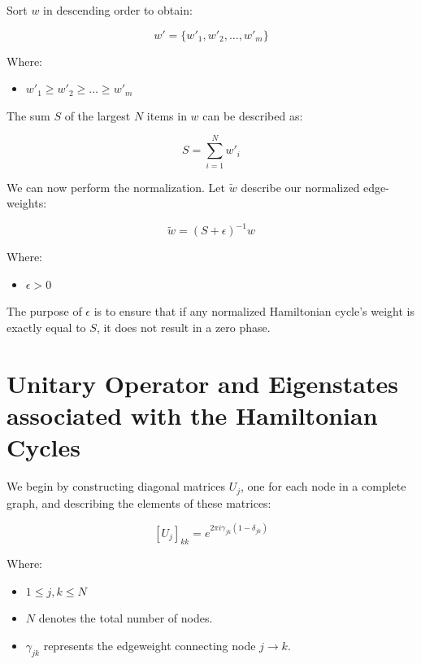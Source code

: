 \documentclass[msc,oneside]{ubcthesis}
\begin{document}
	Sort $w$ in descending order to obtain:
	
	\begin{equation}\label{sorted-weights}
	w' = \{w'_1, w'_2, \ldots, w'_m\}
	\end{equation}
	
	Where: \begin{itemize}
		\item[] $w'_1 \geq w'_2 \geq \ldots \geq w'_m$
		\end{itemize}
		
The sum $S$ of the largest $N$ items in $w$ can be described as:

\begin{equation}\label{sum-S}
S = \sum_{i=1}^{N} w'_i
\end{equation}

  We can now perform the normalization. Let $\tilde{w}$ describe our normalized edge-weights:
  
 \begin{equation}\label{normalization}
  	\tilde{w} = (S + \epsilon)^{-1}w
\end{equation}

Where: \begin{itemize}
	\item[] $\epsilon > 0$
\end{itemize}
The purpose of $\epsilon$ is to ensure that if any normalized Hamiltonian cycle's weight is exactly equal to $S$, it does not result in a zero phase.
	
	
	\section{Unitary Operator and Eigenstates associated with the Hamiltonian Cycles}
	
	We begin by constructing diagonal matrices $U_j$, one for each node in a complete graph, and describing the elements of these matrices:
	
	\begin{equation}\label{Uj-elements}
	\left[U_j \right]_{kk} = e^{2\pi i\gamma_{jk} (1 - \delta_{jk})}
	\end{equation}
	
	Where:	\begin{itemize}
		\item[]  $ 1 \leq j, k \leq N$
		\item[]  $N$ denotes the total number of nodes.
		\item[]  $\gamma_{jk}$ represents the edgeweight connecting node $j\rightarrow k$.
	\end{itemize}
	
\end{document}
